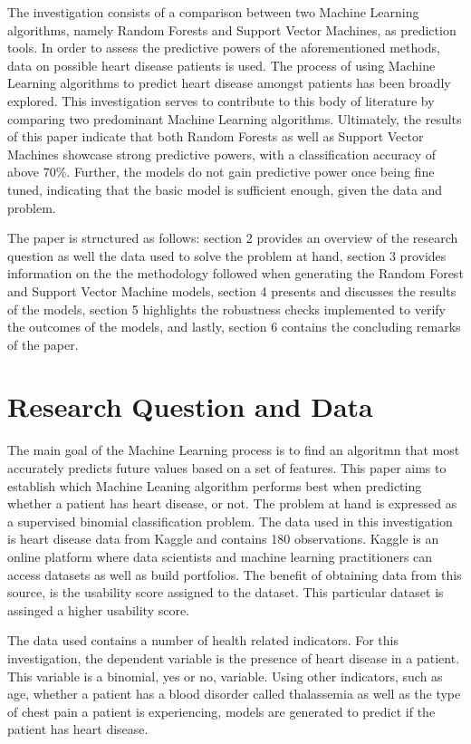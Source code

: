 \documentclass[11pt,preprint, authoryear]{elsarticle}
\numberwithin{equation}{section}
\numberwithin{figure}{section}
\numberwithin{table}{section}
\begin{document}
The investigation consists of a comparison between two Machine Learning
algorithms, namely Random Forests and Support Vector Machines, as
prediction tools. In order to assess the predictive powers of the
aforementioned methods, data on possible heart disease patients is used.
The process of using Machine Learning algorithms to predict heart
disease amongst patients has been broadly explored. This investigation
serves to contribute to this body of literature by comparing two
predominant Machine Learning algorithms. Ultimately, the results of this
paper indicate that both Random Forests as well as Support Vector
Machines showcase strong predictive powers, with a classification
accuracy of above 70\%. Further, the models do not gain predictive power
once being fine tuned, indicating that the basic model is sufficient
enough, given the data and problem.

The paper is structured as follows: section 2 provides an overview of
the research question as well the data used to solve the problem at
hand, section 3 provides information on the the methodology followed
when generating the Random Forest and Support Vector Machine models,
section 4 presents and discusses the results of the models, section 5
highlights the robustness checks implemented to verify the outcomes of
the models, and lastly, section 6 contains the concluding remarks of the
paper.

\hypertarget{research-question-and-data}{%
\section{Research Question and Data}\label{research-question-and-data}}

The main goal of the Machine Learning process is to find an algoritmn
that most accurately predicts future values based on a set of features.
This paper aims to establish which Machine Leaning algorithm performs
best when predicting whether a patient has heart disease, or not. The
problem at hand is expressed as a supervised binomial classification
problem. The data used in this investigation is heart disease data from
Kaggle and contains 180 observations. Kaggle is an online platform where
data scientists and machine learning practitioners can access datasets
as well as build portfolios. The benefit of obtaining data from this
source, is the usability score assigned to the dataset. This particular
dataset is assinged a higher usability score.

The data used contains a number of health related indicators. For this
investigation, the dependent variable is the presence of heart disease
in a patient. This variable is a binomial, yes or no, variable. Using
other indicators, such as age, whether a patient has a blood disorder
called thalassemia as well as the type of chest pain a patient is
experiencing, models are generated to predict if the patient has heart
disease.
\end{document}
